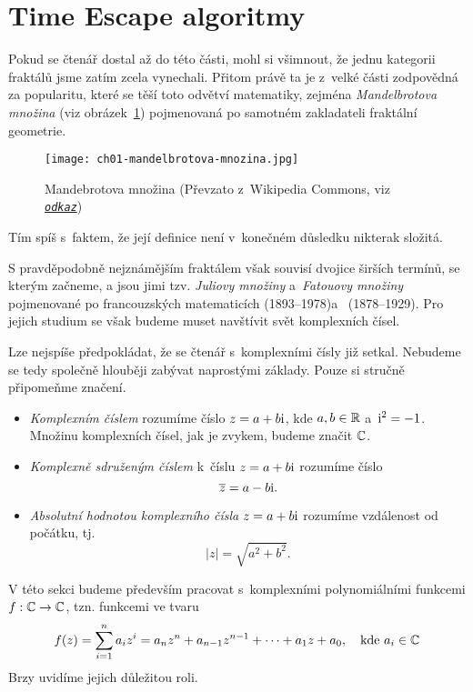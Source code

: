 \section{Time Escape algoritmy}\label{sec:tea}

Pokud se čtenář dostal až do této části, mohl si všimnout, že jednu kategorii fraktálů jsme zatím zcela vynechali. Přitom právě ta je z~velké části zodpovědná za popularitu, které se těší toto odvětví matematiky, zejména \emph{Mandelbrotova množina} (viz obrázek~\ref{fig:mandebrotova-mnozina}) pojmenovaná po samotném zakladateli fraktální geometrie.
\begin{figure}[h]
    \centering
    \texttt{[image: ch01-mandelbrotova-mnozina.jpg]}
    \caption[Mandebrotova množina]{Mandebrotova množina (Převzato z~Wikipedia Commons, viz \href{https://en.wikipedia.org/wiki/Mandelbrot\_set\#/media/File:Mandel\_zoom\_00\_mandelbrot\_set.jpg}{\texttt{\textit{odkaz}}})}
    \label{fig:mandebrotova-mnozina}
\end{figure}
Tím spíš s~faktem, že její definice není v~konečném důsledku nikterak složitá.

S pravděpodobně nejznámějším fraktálem však souvisí dvojice širších termínů, se kterým začneme, a jsou jimi tzv. \emph{Juliovy množiny} a~\emph{Fatouovy množiny} pojmenované po francouzských matematicích  (1893--1978)\linebreak a~ (1878--1929). Pro jejich studium se však budeme muset navštívit svět komplexních čísel.

Lze nejspíše předpokládat, že se čtenář s~komplexními čísly již setkal. Nebudeme se tedy společně hlouběji zabývat naprostými základy. Pouze si stručně připomeňme značení.
\begin{itemize}
    \item \emph{Komplexním číslem} rozumíme číslo $z=a+b\textrm{i}$, kde $a,b\in\mathbb{R}$ a~$\textrm{i}^2=-1$. Množinu komplexních čísel, jak je zvykem, budeme značit $\mathbb{C}$.
    \item \emph{Komplexně sdruženým číslem} k~číslu $z=a+b\textrm{i}$ rozumíme číslo
    \[\overline{z}=a-b\textrm{i}.\]
    \item \emph{Absolutní hodnotou komplexního čísla} $z=a+b\textrm{i}$ rozumíme vzdálenost od počátku, tj.
    \[|z|=\sqrt{a^2+b^2}.\]
\end{itemize}
V této sekci budeme především pracovat s~komplexními polynomiálními funkcemi $f:\mathbb{C} \rightarrow \mathbb{C}$, tzn. funkcemi ve tvaru
\[f(z)=\sum_{i=1}^{n}a_iz^i=a_nz^n+a_{n-1}z^{n-1}+\dots+a_1z+a_0,\quad\text{kde $a_i\in\mathbb{C}$}\]
Brzy uvidíme jejich důležitou roli.

